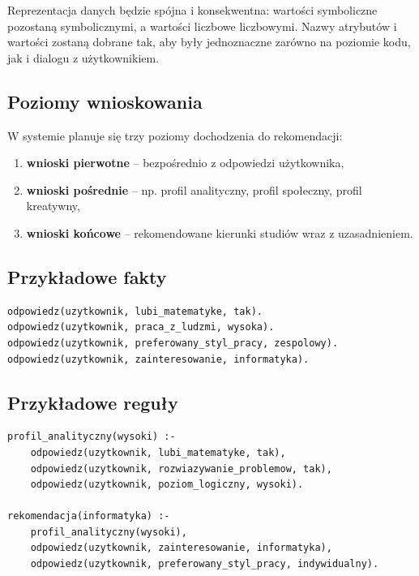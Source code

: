 \documentclass[12pt,a4paper,oneside]{article}
\begin{document}
Reprezentacja danych będzie spójna i konsekwentna: wartości symboliczne pozostaną symbolicznymi, a wartości liczbowe liczbowymi. Nazwy atrybutów i wartości zostaną dobrane tak, aby były jednoznaczne zarówno na poziomie kodu, jak i dialogu z użytkownikiem.

\subsection{Poziomy wnioskowania}

W systemie planuje się trzy poziomy dochodzenia do rekomendacji:
\begin{enumerate}[leftmargin=1.2cm]
    \item \textbf{wnioski pierwotne} – bezpośrednio z odpowiedzi użytkownika,
    \item \textbf{wnioski pośrednie} – np. profil analityczny, profil społeczny, profil kreatywny,
    \item \textbf{wnioski końcowe} – rekomendowane kierunki studiów wraz z uzasadnieniem.
\end{enumerate}

\subsection{Przykładowe fakty}

\begin{verbatim}
odpowiedz(uzytkownik, lubi_matematyke, tak).
odpowiedz(uzytkownik, praca_z_ludzmi, wysoka).
odpowiedz(uzytkownik, preferowany_styl_pracy, zespolowy).
odpowiedz(uzytkownik, zainteresowanie, informatyka).
\end{verbatim}

\subsection{Przykładowe reguły}

\begin{verbatim}
profil_analityczny(wysoki) :-
    odpowiedz(uzytkownik, lubi_matematyke, tak),
    odpowiedz(uzytkownik, rozwiazywanie_problemow, tak),
    odpowiedz(uzytkownik, poziom_logiczny, wysoki).

rekomendacja(informatyka) :-
    profil_analityczny(wysoki),
    odpowiedz(uzytkownik, zainteresowanie, informatyka),
    odpowiedz(uzytkownik, preferowany_styl_pracy, indywidualny).
\end{verbatim}

\end{document}

